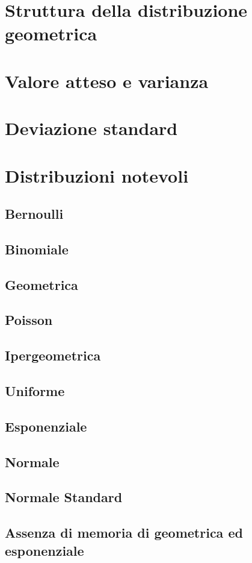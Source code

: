     \section{Struttura della distribuzione geometrica}
    \section{Valore atteso e varianza}
    \section{Deviazione standard}
    \section{Distribuzioni notevoli}
        \subsection{Bernoulli}
        \subsection{Binomiale}
        \subsection{Geometrica}
        \subsection{Poisson}
        \subsection{Ipergeometrica}
        \subsection{Uniforme}
        \subsection{Esponenziale}
        \subsection{Normale}
        \subsection{Normale Standard}
        \subsection*{Assenza di memoria di geometrica ed esponenziale}
